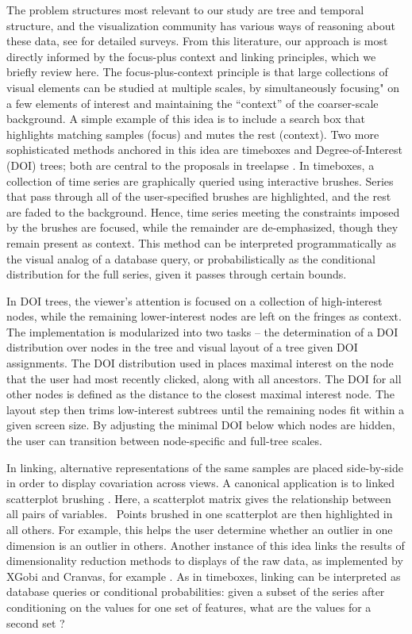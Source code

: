 \documentclass[12pt]{article}
\begin{document}
The problem structures most relevant to our study are tree and temporal
structure, and the visualization community has various ways of reasoning about
these data, see \citep{graham2010survey, aigner2011visualization} for detailed
surveys. From this literature, our approach is most directly informed by the
focus-plus context and linking principles, which we briefly review here. The
focus-plus-context principle is that large collections of visual elements can be
studied at multiple scales, by simultaneously focusing" on a few elements of
interest and maintaining the ``context'' of the coarser-scale background. A
simple example of this idea is to include a search box that highlights matching
samples (focus) and mutes the rest (context). Two more sophisticated methods
anchored in this idea are timeboxes and Degree-of-Interest (DOI) trees; both are
central to the proposals in treelapse \citep{hochheiser2004dynamic,
  heer2004doitrees}. In timeboxes, a collection of time series are graphically
queried using interactive brushes. Series that pass through all of the
user-specified brushes are highlighted, and the rest are faded to the
background. Hence, time series meeting the constraints imposed by the brushes
are focused, while the remainder are de-emphasized, though they remain present
as context. This method can be interpreted programmatically as the visual analog
of a database query, or probabilistically as the conditional distribution for
the full series, given it passes through certain bounds.

In DOI trees, the viewer's attention is focused on a collection of high-interest
nodes, while the remaining lower-interest nodes are left on the fringes as
context. The implementation is modularized into two tasks -- the determination
of a DOI distribution over nodes in the tree and visual layout of a tree given
DOI assignments. The DOI distribution used in \citep{heer2004doitrees} places
maximal interest on the node that the user had most recently clicked, along with
all ancestors. The DOI for all other nodes is defined as the distance to the
closest maximal interest node. The layout step then trims low-interest subtrees
until the remaining nodes fit within a given screen size. By adjusting the
minimal DOI below which nodes are hidden, the user can transition between
node-specific and full-tree scales.

In linking, alternative representations of the same samples are placed
side-by-side in order to display covariation across views. A canonical
application is to linked scatterplot brushing \citep{becker1987brushing}. Here,
a scatterplot matrix gives the relationship between all pairs of variables.
~Points brushed in one scatterplot are then highlighted in all others. For
example, this helps the user determine whether an outlier in one dimension is an
outlier in others. Another instance of this idea links the results of
dimensionality reduction methods to displays of the raw data, as implemented by
XGobi and Cranvas, for example \citep{xie2013cranvas, swayne1998xgobi}. As in
timeboxes, linking can be interpreted as database queries or conditional
probabilities: given a subset of the series after conditioning on the values for
one set of features, what are the values for a second set
\citep{buja1996interactive}?
\end{document}
